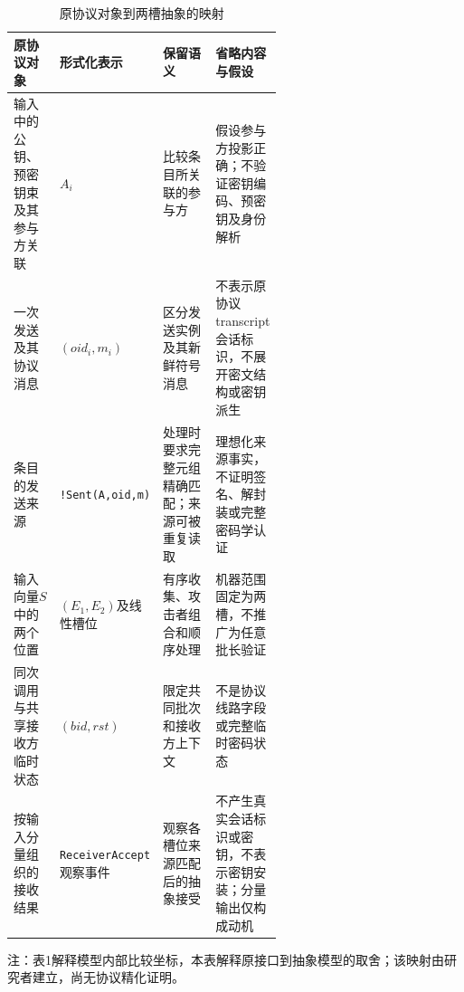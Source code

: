 \begin{table}[htbp]
  \centering
  \caption{原协议对象到两槽抽象的映射}
  \label{tab:source-to-abstraction}
  \footnotesize
  \setlength{\tabcolsep}{3pt}
  \begin{tabularx}{\linewidth}{@{}L{0.19\linewidth}L{0.17\linewidth}L{0.23\linewidth}Y@{}}
    \toprule
    原协议对象 & 形式化表示 & 保留语义 & 省略内容与假设 \\
    \midrule
    输入中的公钥、预密钥束及其参与方关联 & $A_i$ & 比较条目所关联的参与方 & 假设参与方投影正确；不验证密钥编码、预密钥及身份解析 \\
    一次发送及其协议消息 & $(\mathit{oid}_i,m_i)$ & 区分发送实例及其新鲜符号消息 & 不表示原协议transcript会话标识，不展开密文结构或密钥派生 \\
    条目的发送来源 & \texttt{!Sent(A,oid,m)} & 处理时要求完整元组精确匹配；来源可被重复读取 & 理想化来源事实，不证明签名、解封装或完整密码学认证 \\
    输入向量$S$中的两个位置 & $(E_1,E_2)$及线性槽位 & 有序收集、攻击者组合和顺序处理 & 机器范围固定为两槽，不推广为任意批长验证 \\
    同次调用与共享接收方临时状态 & $(\mathit{bid},\mathit{rst})$ & 限定共同批次和接收方上下文 & 不是协议线路字段或完整临时密码状态 \\
    按输入分量组织的接收结果 & \texttt{ReceiverAccept}观察事件 & 观察各槽位来源匹配后的抽象接受 & 不产生真实会话标识或密钥，不表示密钥安装；分量输出仅构成动机 \\
    \bottomrule
  \end{tabularx}
  \par\smallskip
  \begin{minipage}{\linewidth}
    \scriptsize 注：表1解释模型内部比较坐标，本表解释原接口到抽象模型的取舍；该映射由研究者建立，尚无协议精化证明。
  \end{minipage}
\end{table}
